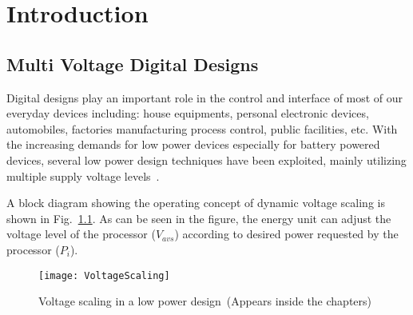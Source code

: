 \chapter{Introduction}
\label{ch1}
\section{Multi Voltage Digital Designs}

Digital designs play an important role in the control and interface of most of our everyday devices including: house equipments, personal electronic devices, automobiles, factories manufacturing process control, public facilities, etc. With the increasing demands for low power devices especially for battery powered devices, several low power design techniques have been exploited, mainly utilizing multiple supply voltage levels~\cite{M.Pedram-02}. \par

A block diagram showing the operating concept of dynamic voltage scaling is shown in Fig.~\ref{fig:VoltageScaling}. As can be seen in the figure, the energy unit can adjust the voltage level of the processor ($V_{avs}$) according to desired power requested by the processor ($P_i$).\par

\begin{figure}
	\centering
		\texttt{[image: VoltageScaling]}
		\caption[Voltage scaling in a low power design(Appears in TOC ONLY)]{Voltage scaling in a low power design~\cite{S.Khursheed-10Thesis}(Appears inside the chapters)}
	\label{fig:VoltageScaling}
\end{figure}
	
